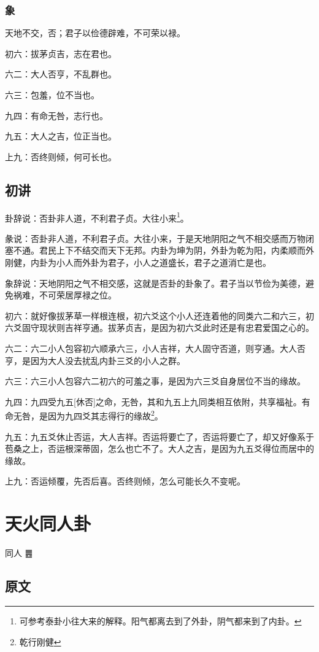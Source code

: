 \documentclass[12pt,oneside]{book}
\begin{document}
\subsection{象}
天地不交，否；君子以俭德辟难，不可荣以禄。

初六：拔茅贞吉，志在君也。

六二：大人否亨，不乱群也。

六三：包羞，位不当也。

九四：有命无咎，志行也。

九五：大人之吉，位正当也。

上九：否终则倾，何可长也。


\section{初讲}
卦辞说：否卦非人道，不利君子贞。大往小来\footnote{可参考泰卦小往大来的解释。阳气都离去到了外卦，阴气都来到了内卦。}。

彖说：否卦非人道，不利君子贞。大往小来，于是天地阴阳之气不相交感而万物闭塞不通。君民上下不结交而天下无邦。内卦为坤为阴，外卦为乾为阳，内柔顺而外刚健，内卦为小人而外卦为君子，小人之道盛长，君子之道消亡是也。

象辞说：天地阴阳之气不相交感，这就是否卦的卦象了。君子当以节俭为美德，避免祸难，不可荣居厚禄之位。

初六：就好像拔茅草一样根连根，初六爻这个小人还连着他的同类六二和六三，初六爻固守现状则吉祥亨通。拔茅贞吉，是因为初六爻此时还是有忠君爱国之心的。

六二：六二小人包容初六顺承六三，小人吉祥，大人固守否道，则亨通。大人否亨，是因为大人没去扰乱内卦三爻的小人之群。

六三：六三小人包容六二初六的可羞之事，是因为六三爻自身居位不当的缘故。

九四：九四受九五[休否]之命，无咎，其和九五上九同类相互依附，共享福祉。有命无咎，是因为九四爻其志得行的缘故\footnote{乾行刚健}。

九五：九五爻休止否运，大人吉祥。否运将要亡了，否运将要亡了，却又好像系于苞桑之上，否运根深蒂固，怎么也亡不了。大人之吉，是因为九五爻得位而居中的缘故。

上九：否运倾覆，先否后喜。否终则倾，怎么可能长久不变呢。


\chapter{天火同人卦}
同人 {\Large ䷌}

\section{原文}
\end{document}
